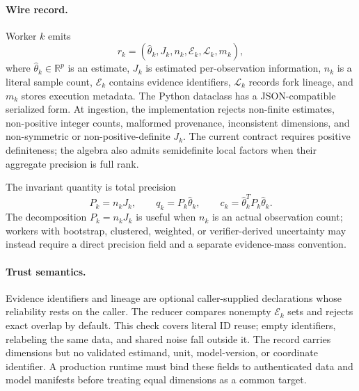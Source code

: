 \paragraph{Wire record.}
Worker $k$ emits
\begin{equation}
r_k=(\hat\theta_k,J_k,n_k,\mathcal E_k,\mathcal L_k,m_k),
\label{eq:contract}
\end{equation}
where $\hat\theta_k\in\mathbb R^p$ is an estimate, $J_k$ is estimated
per-observation information, $n_k$ is a literal sample count, $\mathcal E_k$ contains evidence
identifiers, $\mathcal L_k$ records fork lineage, and $m_k$ stores execution metadata. The
Python dataclass has a JSON-compatible serialized form. At ingestion, the implementation rejects
non-finite estimates, non-positive integer counts, malformed provenance, inconsistent dimensions,
and non-symmetric or non-positive-definite $J_k$. The current contract requires positive
definiteness; the algebra also admits semidefinite local factors when their aggregate precision
is full rank.

The invariant quantity is total precision
\begin{equation}
P_k=n_kJ_k,\qquad q_k=P_k\hat\theta_k,\qquad
c_k=\hat\theta_k^TP_k\hat\theta_k.
\label{eq:canonical}
\end{equation}
The decomposition $P_k=n_kJ_k$ is useful when $n_k$ is an actual observation count; workers with
bootstrap, clustered, weighted, or verifier-derived uncertainty may instead require a direct
precision field and a separate evidence-mass convention.

\paragraph{Trust semantics.}
Evidence identifiers and lineage are optional caller-supplied declarations whose reliability
rests on the caller. The reducer compares nonempty $\mathcal E_k$ sets and rejects exact overlap
by default. This check covers literal ID reuse; empty identifiers, relabeling the same data, and
shared noise fall outside it. The record carries dimensions but no validated estimand, unit,
model-version, or coordinate identifier. A production runtime must bind these fields to
authenticated data and model manifests before treating equal dimensions as a common target.

